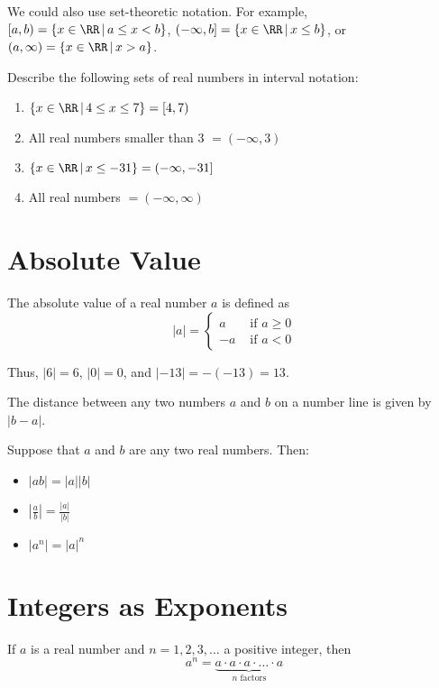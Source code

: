 \documentclass{ximera}
\begin{document}
We could also use set-theoretic notation. For example, $[a,b) = \{ x \in \RR \, | \, a \leq x < b\}$, $(-\infty, b] = \{x \in \RR \, | \, x \leq b \}$,
or $(a, \infty) = \{ x \in \RR \, | \, x > a\}$.

\begin{example}
Describe the following sets of real numbers in interval notation:
\begin{enumerate}
	\item $\{ x \in \RR \, | \, 4 \leq x \leq 7 \} = [4,7)$
	\item All real numbers smaller than 3 $= (-\infty, 3)$
	\item $\{ x \in \RR \, | \,  x \leq -31 \} = (-\infty, -31]$
	\item All real numbers $=(-\infty, \infty)$
\end{enumerate}
\end{example}

\section{Absolute Value}
The absolute value of a real number $a$ is defined as
\[ |a| = \begin{cases} a & \textrm{ if } a \geq 0\\
                       -a & \textrm{ if } a < 0 \end{cases} \]

Thus, $|6| = 6$, $|0| = 0$, and $|-13| = -(-13) = 13$.

The distance between any two numbers $a$ and $b$ on a number line is given by $|b-a|$.

\begin{theorem}
  Suppose that $a$ and $b$ are any two real numbers. Then:
  \begin{itemize}
    \item $|ab|=|a||b|$
    \item $\left|\frac{a}{b}\right|=\frac{|a|}{|b|}$
    \item $\left|a^n\right|=|a|^n$
  \end{itemize}
\end{theorem}

\section{Integers as Exponents}
If $a$ is a real number and $n=1,2,3, \ldots$ a positive integer, then
\[ a^n = \underbrace{a \cdot a \cdot a \cdot \ldots \cdot a}_{n \textrm{ factors}} \]
\end{document}
